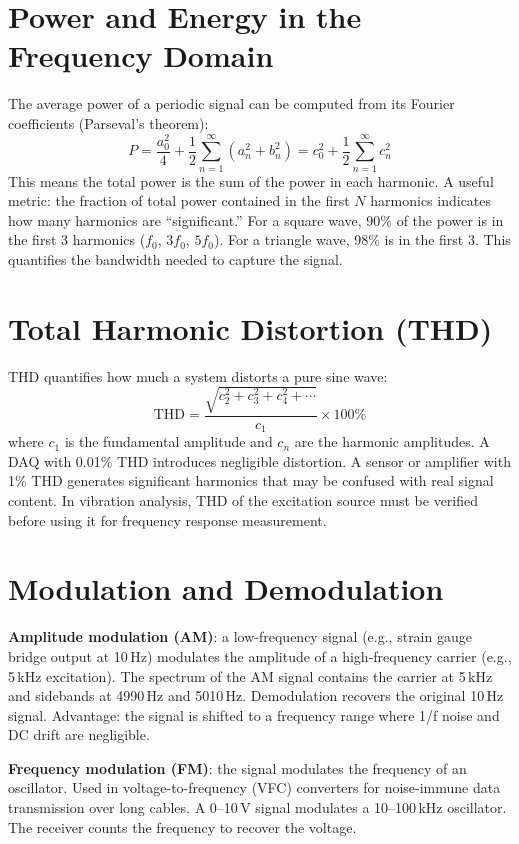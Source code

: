 \documentclass[11pt,letterpaper,twoside,openany]{book}
\begin{document}
\section{Power and Energy in the Frequency Domain}
The average power of a periodic signal can be computed from its Fourier coefficients (Parseval's theorem):
\begin{equation}
P = \frac{a_0^2}{4} + \frac{1}{2}\sum_{n=1}^{\infty}(a_n^2 + b_n^2) = c_0^2 + \frac{1}{2}\sum_{n=1}^{\infty}c_n^2
\end{equation}
This means the total power is the sum of the power in each harmonic. A useful metric: the fraction of total power contained in the first $N$ harmonics indicates how many harmonics are ``significant.'' For a square wave, 90\% of the power is in the first 3 harmonics ($f_0$, $3f_0$, $5f_0$). For a triangle wave, 98\% is in the first 3. This quantifies the bandwidth needed to capture the signal.

\section{Total Harmonic Distortion (THD)}
THD quantifies how much a system distorts a pure sine wave:
\begin{equation}
\text{THD} = \frac{\sqrt{c_2^2 + c_3^2 + c_4^2 + \cdots}}{c_1} \times 100\%
\end{equation}
where $c_1$ is the fundamental amplitude and $c_n$ are the harmonic amplitudes. A DAQ with 0.01\% THD introduces negligible distortion. A sensor or amplifier with 1\% THD generates significant harmonics that may be confused with real signal content. In vibration analysis, THD of the excitation source must be verified before using it for frequency response measurement.

\section{Modulation and Demodulation}
\textbf{Amplitude modulation (AM)}: a low-frequency signal (e.g., strain gauge bridge output at 10\,Hz) modulates the amplitude of a high-frequency carrier (e.g., 5\,kHz excitation). The spectrum of the AM signal contains the carrier at 5\,kHz and sidebands at 4990\,Hz and 5010\,Hz. Demodulation recovers the original 10\,Hz signal. Advantage: the signal is shifted to a frequency range where 1/f noise and DC drift are negligible.

\textbf{Frequency modulation (FM)}: the signal modulates the frequency of an oscillator. Used in voltage-to-frequency (VFC) converters for noise-immune data transmission over long cables. A 0--10\,V signal modulates a 10--100\,kHz oscillator. The receiver counts the frequency to recover the voltage.
\end{document}
